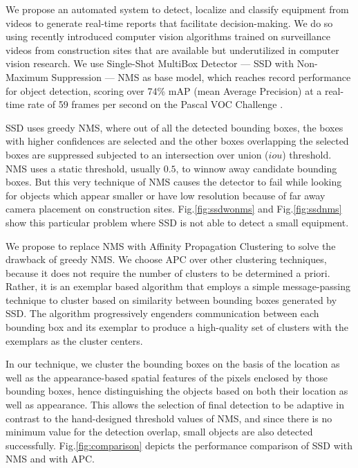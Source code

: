 \documentclass[conference]{IEEEtran}
\begin{document}
We propose an automated system to detect, localize and classify equipment from videos to generate real-time reports that facilitate decision-making. We do so using recently introduced computer vision algorithms \cite{lecun2015deep,voulodimos2018deep} trained on surveillance videos from construction sites that are available but underutilized in computer vision research. We use Single-Shot MultiBox Detector --- SSD with Non-Maximum Suppression --- NMS \cite{DBLP:journals/corr/LiuAESR15} as base model, which reaches record performance for object detection, scoring over 74\% mAP (mean Average Precision) at a real-time rate of 59 frames per second on the Pascal VOC Challenge \cite{everingham2010pascal}. 

SSD uses greedy NMS, where out of all the detected bounding boxes, the boxes with higher confidences are selected and the other boxes overlapping the selected boxes are suppressed subjected to an intersection over union ($iou$) threshold. NMS uses a static threshold, usually $0.5$, to winnow away candidate bounding boxes. But this very technique of NMS causes the detector to fail while looking for objects which appear smaller or have low resolution because of far away camera placement on construction sites. Fig.\ref{fig:ssdwonms} and Fig.\ref{fig:ssdnms} show this particular problem where SSD is not able to detect a small equipment.  

We propose to replace NMS with Affinity Propagation Clustering \cite{frey2007clustering} to solve the drawback of greedy NMS. We choose APC over other clustering techniques, because it does not require the number of clusters to be determined a priori. Rather, it is an exemplar based algorithm that employs a simple message-passing technique to cluster based on similarity between bounding boxes generated by SSD. The algorithm progressively engenders communication between each bounding box and its exemplar to produce a high-quality set of clusters with the exemplars as the cluster centers. 

In our technique, we cluster the bounding boxes on the basis of the location as well as the appearance-based spatial features of the pixels enclosed by those bounding boxes, hence distinguishing the objects based on both their location as well as appearance. This allows the selection of final detection to be adaptive in contrast to the hand-designed threshold values of NMS, and since there is no minimum value for the detection overlap, small objects are also detected successfully. Fig.\ref{fig:comparison} depicts the performance comparison of SSD with NMS and with APC. 
\end{document}
